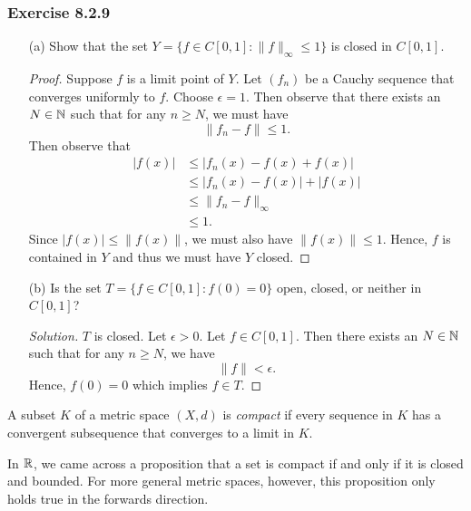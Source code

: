 \subsubsection{Exercise 8.2.9} 
\begin{enumerate}
    \item[(a)] Show that the set \( Y = \{ f \in C[0,1] :  \lVert f \rVert_{\infty } \leq 1  \}  \) is closed in \( C[0,1] \).
        \begin{proof}
        Suppose \( f  \) is a limit point of \( Y  \). Let \( (f_{n}) \) be a Cauchy sequence that converges uniformly to \( f  \). Choose \( \epsilon  =1  \). Then observe that there exists an \( N \in \mathbb{N}  \) such that for any \( n \geq N  \), we must have 
        \[ \lVert f_{n} - f  \rVert \leq 1. \] Then observe that 
        \begin{align*}
            | f(x) | &\leq | f_{n}(x) - f(x) + f(x)  |  \\
                  &\leq | f_{n}(x) - f(x)  | + | f(x)  | \\
                  &\leq \lVert f_{n} - f  \rVert_{\infty } \\
                  &\leq 1.
        \end{align*}
        Since \( | f(x)  |  \leq \lVert  f(x)  \rVert  \), we must also have \( \lVert f(x)  \rVert \leq 1  \).
        Hence, \( f  \) is contained in \( Y  \) and thus we must have \( Y  \) closed.
        \end{proof}
    \item[(b)] Is the set \( T = \{ f \in C[0,1] : f(0) = 0  \}  \) open, closed, or neither in \( C[0,1] \)? 
        \begin{proof}[Solution]
            \( T  \) is closed. Let \( \epsilon > 0  \). Let \( f \in C[0,1] \). Then there exists an  \( N \in \mathbb{N}   \) such that for any \( n \geq N  \), we have 
        \[ \lVert f  \rVert < \epsilon.   \] Hence, \( f(0) = 0  \) which implies \( f \in T \).
        \end{proof}
\end{enumerate}



\begin{definition}
A subset \( K  \) of a metric space \( (X,d)  \) is \textit{compact} if every sequence in \( K  \) has a convergent subsequence that converges to a limit in \( K  \).
\end{definition}

In \( \mathbb{R}  \), we came across a proposition that a set is compact if and only if it is closed and bounded. For more general metric spaces, however, this proposition only holds true in the forwards direction.

